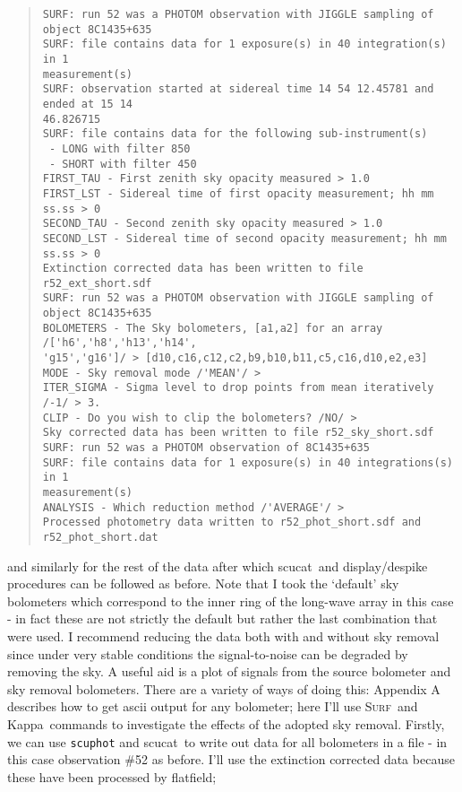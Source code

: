 \documentclass[twoside,11pt,fleqn]{article}
\newenvironment{myquote}{\begin{quote}\begin{small}}{\end{small}\end{quote}}
\newcommand{\Kappa}{\xref{{\sc Kappa}}{sun95}{}}
\newcommand{\surf}{\xref{\textsc{Surf}}{sun216}{}}
\newcommand{\task}[1]{{\sf #1}}
\newcommand{\flatf}{\xref{\task{flatfield}}{sun216}{FLATFIELD}}
\newcommand{\scucat}{\xref{\task{scucat}}{sun216}{SCUCAT}}
\newcommand{\xref}[3]{#1}
\begin{document}
\begin{myquote}
\begin{verbatim}
SURF: run 52 was a PHOTOM observation with JIGGLE sampling of object 8C1435+635
SURF: file contains data for 1 exposure(s) in 40 integration(s) in 1
measurement(s)
SURF: observation started at sidereal time 14 54 12.45781 and ended at 15 14
46.826715
SURF: file contains data for the following sub-instrument(s)
 - LONG with filter 850
 - SHORT with filter 450
FIRST_TAU - First zenith sky opacity measured > 1.0
FIRST_LST - Sidereal time of first opacity measurement; hh mm ss.ss > 0
SECOND_TAU - Second zenith sky opacity measured > 1.0
SECOND_LST - Sidereal time of second opacity measurement; hh mm ss.ss > 0
Extinction corrected data has been written to file r52_ext_short.sdf
SURF: run 52 was a PHOTOM observation with JIGGLE sampling of object 8C1435+635
BOLOMETERS - The Sky bolometers, [a1,a2] for an array /['h6','h8','h13','h14',
'g15','g16']/ > [d10,c16,c12,c2,b9,b10,b11,c5,c16,d10,e2,e3]
MODE - Sky removal mode /'MEAN'/ > 
ITER_SIGMA - Sigma level to drop points from mean iteratively /-1/ > 3.
CLIP - Do you wish to clip the bolometers? /NO/ > 
Sky corrected data has been written to file r52_sky_short.sdf
SURF: run 52 was a PHOTOM observation of 8C1435+635
SURF: file contains data for 1 exposure(s) in 40 integrations(s) in 1
measurement(s)
ANALYSIS - Which reduction method /'AVERAGE'/ > 
Processed photometry data written to r52_phot_short.sdf and r52_phot_short.dat
\end{verbatim}
\end{myquote}

and similarly for the rest of the data after which \scucat\ and
display/despike procedures can be followed as before. Note that I took
the `default' sky bolometers which correspond to the inner ring of the
long-wave array in this case - in fact these are not strictly the
default but rather the last combination that were used. I recommend
reducing the data both with and without sky removal since under very
stable conditions the signal-to-noise can be degraded by removing the
sky.  A useful aid is a plot of signals from the source bolometer and
sky removal bolometers. There are a variety of ways of doing this:
Appendix A describes how to get ascii output for any bolometer; here
I'll use \surf\ and \Kappa\ commands to investigate the
effects of the adopted sky removal. Firstly, we can use {\tt scuphot}
and \scucat\ to write out data for all bolometers in a file - in
this case observation \#52 as before. I'll use the extinction
corrected data because these have been processed by \flatf;
\end{document}
